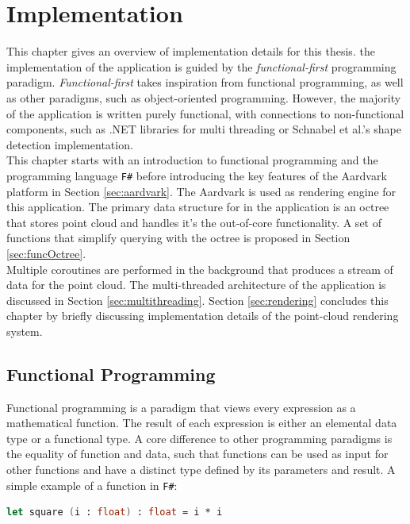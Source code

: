 \chapter{Implementation}
\label{chap:implementation}

This chapter gives an overview of implementation details for this thesis. the implementation of the application is guided by the \textit{functional-first} programming paradigm. \textit{Functional-first} takes inspiration from functional programming, as well as other paradigms, such as object-oriented programming. However, the majority of the application is written purely functional, with connections to non-functional components, such as .NET libraries for multi threading or Schnabel et al.'s shape detection implementation\cite{schnabel-2007-software}. 
\\
This chapter starts with an introduction to functional programming and the programming language \verb|F#|\cite{FSharp} before introducing the key features of the Aardvark platform\cite{aardvark}  in Section \ref{sec:aardvark}. The Aardvark is used as rendering engine for this application. The primary data structure for in the application is an octree that stores point cloud and handles it's the out-of-core functionality. A set of functions that simplify querying with the octree is proposed in Section \ref{sec:funcOctree}. 
\\
Multiple coroutines are performed in the background that produces a stream of data for the point cloud. The multi-threaded architecture of the application is discussed in Section \ref{sec:multithreading}. Section \ref{sec:rendering} concludes this chapter by briefly discussing implementation details of the point-cloud rendering system. 


\section{Functional Programming}
\label{sec:funprog}

Functional programming is a paradigm that views every expression as a mathematical function. The result of each expression is either an elemental data type or a functional type. A core difference to other programming paradigms is the equality of function and data, such that functions can be used as input for other functions and have a distinct type defined by its parameters and result. A simple example of a function in \verb|F#|: 

\begin{lstlisting}[language=FSharp]
let square (i : float) : float = i * i 
\end{lstlisting}

